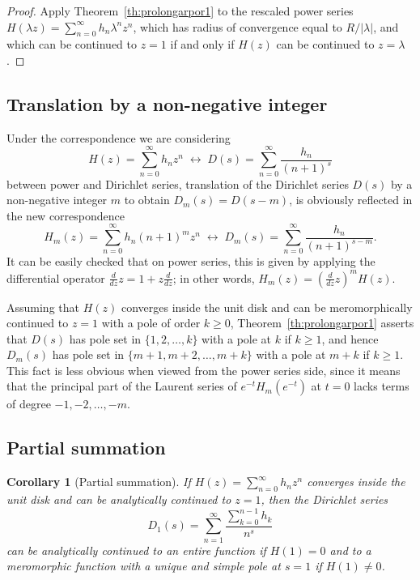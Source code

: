 \documentclass[11pt,a4paper]{amsart}
\theoremstyle{plain}
\theoremstyle{plain}
\newtheorem{corollary}{Corollary}
\theoremstyle{plain}
\theoremstyle{definition}
\theoremstyle{remark}
\begin{document}
\begin{proof}
Apply Theorem~\ref{th:prolongarpor1} to the rescaled power series $H(\lambda z) = \sum_{n=0}^{\infty} h_{n} \lambda^{n} z^{n}$, which has radius of convergence equal to $R/|\lambda|$, and which can be continued to $z=1$ if and only if $H(z)$ can be continued to $z=\lambda$.
\end{proof}


\subsection{Translation by a non-negative integer}
\label{subsec:translationN0}

Under the correspondence we are considering
\[
  H(z) = \sum_{n=0}^{\infty} h_{n} z^{n}
  \;\longleftrightarrow\; D(s) = \sum_{n=0}^{\infty} \frac{h_{n}}{(n+1)^{s}}
\]
between power and Dirichlet series, translation of the Dirichlet series $D(s)$ by a non-negative integer $m$ to obtain $D_{m}(s) = D(s-m)$, is obviously reflected in the new correspondence
\[
  H_{m}(z) = \sum_{n=0}^{\infty} h_{n} (n+1)^{m} z^{n}
  \;\longleftrightarrow\; D_{m}(s) = \sum_{n=0}^{\infty} \frac{h_{n}}{(n+1)^{s-m}}.
\]
It can be easily checked that on power series, this is given by applying the differential operator $\frac{d}{dz} z = 1 + z \frac{d}{dz}$; in other words, $H_{m}(z) = (\frac{d}{dz} z)^{m} H(z)$.


Assuming that $H(z)$ converges inside the unit disk and can be meromorphically continued to $z=1$ with a pole of order $k \geq 0$, Theorem~\ref{th:prolongarpor1} asserts that $D(s)$ has pole set in $\{1,2,\dots,k\}$ with a pole at $k$ if $k \geq 1$, and hence $D_{m}(s)$ has pole set in $\{m+1,m+2,\dots,m+k\}$ with a pole at $m+k$ if $k \geq 1$. This fact is less obvious when viewed from the power series side, since it means that the principal part of the Laurent series of $e^{-t} H_{m}(e^{-t})$ at $t = 0$ lacks terms of degree $-1,-2,\dots,-m$.


\subsection{Partial summation}
\label{subsec:partialsum}

\begin{corollary}[Partial summation]
\label{cor:partialsum}
If $H(z) = \sum_{n=0}^{\infty} h_{n} z^{n}$ converges inside the unit disk and can be analytically continued to $z=1$, then the Dirichlet series
\[
  D_1(s) = \sum_{n=1}^{\infty} \frac{\sum_{k=0}^{n-1} h_{k}}{n^s}
\]
can be analytically continued to an entire function if $H(1) = 0$ and to a meromorphic function with a unique and simple pole at $s=1$ if $H(1) \neq 0$.
\end{corollary}
\end{document}
